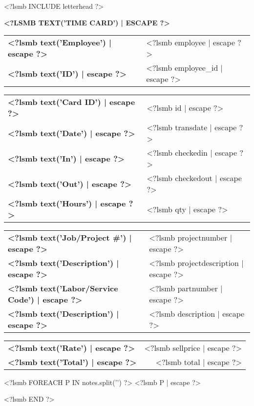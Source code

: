 \documentclass{scrartcl}
\begin{document}
\pagestyle{myheadings}
\thispagestyle{empty}

\fontsize{10pt}{12pt}\selectfont

<?lsmb INCLUDE letterhead ?>

\centerline{\textbf{\MakeUppercase{<?lsmb text('Time Card') | escape ?>}}}

\vspace*{0.5cm}

\begin{tabular}[t]{ll}
  \textbf{<?lsmb text('Employee') | escape ?>} & <?lsmb employee | escape ?> \\
  \textbf{<?lsmb text('ID') | escape ?>} & <?lsmb employee_id | escape ?> \\
\end{tabular}
\hfill
\begin{tabular}[t]{ll}
  \textbf{<?lsmb text('Card ID') | escape ?>} & <?lsmb id | escape ?> \\
  \textbf{<?lsmb text('Date') | escape ?>} & <?lsmb transdate | escape ?> \\
  \textbf{<?lsmb text('In') | escape ?>} & <?lsmb checkedin | escape ?> \\
  \textbf{<?lsmb text('Out') | escape ?>} & <?lsmb checkedout | escape ?> \\
  \textbf{<?lsmb text('Hours') | escape ?>} & <?lsmb qty | escape ?> \\
\end{tabular}

\vspace{1cm}

\begin{tabular}[b]{ll}
  \textbf{<?lsmb text('Job/Project #') | escape ?>} & <?lsmb projectnumber | escape ?> \\
  \textbf{<?lsmb text('Description') | escape ?>} & <?lsmb projectdescription | escape ?> \\
  \textbf{<?lsmb text('Labor/Service Code') | escape ?>} & <?lsmb partnumber | escape ?> \\
  \textbf{<?lsmb text('Description') | escape ?>} & <?lsmb description | escape ?> \\
\end{tabular}
\hfill
\begin{tabular}[b]{lr}
  \textbf{<?lsmb text('Rate') | escape ?>} & <?lsmb sellprice | escape ?> \\
  \textbf{<?lsmb text('Total') | escape ?>} & <?lsmb total | escape ?> \\
\end{tabular}
  
\vspace{0.3cm}

<?lsmb FOREACH P IN notes.split('') ?>
<?lsmb P | escape ?>\medskip

<?lsmb END ?>
 
\end{document}
